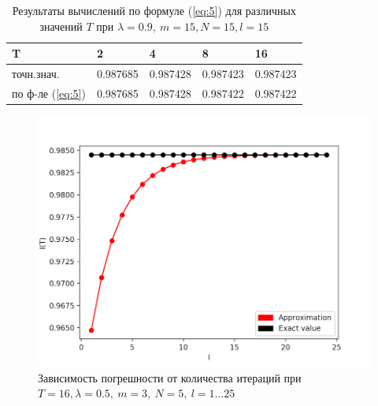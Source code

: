 \documentclass [a4paper, 12pt]{report}
\begin{document}
\begin{table}
\caption{Результаты вычислений по формуле (\ref{eq:5}) для
различных значений $T$ при $\lambda=0.9,~m=15, N=15, l=15$}
\begin{center}
\begin{tabular}{ | m{3cm} | m{2cm}| m{2cm} | m{2cm} | m{2cm} | }
\hline
 T & 2 & 4 & 8 & 16 \\
\hline
 точн.знач. & 0.987685 & 0.987428 & 0.987423 & 0.987423 \\
 по ф-ле (\ref{eq:5}) & 0.987685 & 0.987428 & 0.987422 & 0.987422 \\
\hline
\end{tabular}
\end{center}
\end{table}

\begin{figure}
\begin{center}
\includegraphics{l_dependency.png}
\end{center}
\caption{Зависимость погрешности от количества
итераций при $T=16, \lambda=0.5,~m=3, ~N=5, ~l=1...25$}
\end{figure}
\end{document}
